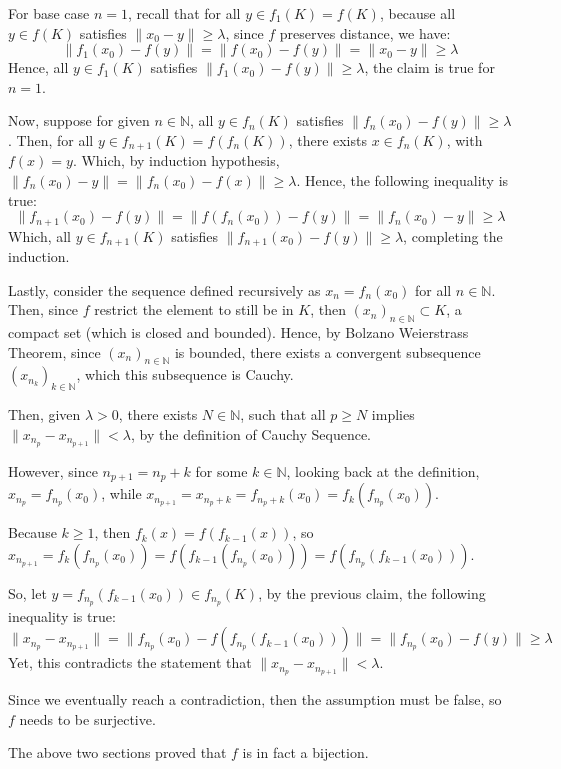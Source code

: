 \documentclass{article}
\begin{document}
For base case $n=1$, recall that for all $y\in f_1(K) = f(K)$, because all $y\in f(K)$ satisfies $\|x_0-y\|\geq \lambda$, since $f$ preserves distance, we have:
$$\|f_1(x_0)-f(y)\| =\|f(x_0)-f(y)\| = \|x_0-y\| \geq \lambda$$
Hence, all $y\in f_1(K)$ satisfies $\|f_1(x_0)-f(y)\|\geq \lambda$, the claim is true for $n=1$.

Now, suppose for given $n\in\mathbb{N}$, all $y\in f_{n}(K)$ satisfies $\|f_n(x_0)-f(y)\|\geq \lambda$.
Then, for all $y\in f_{n+1}(K) = f(f_n(K))$, there exists $x\in f_n(K)$, with $f(x)=y$. Which, by induction hypothesis, $\|f_n(x_0)-y\|=\|f_n(x_0)-f(x)\| \geq \lambda$. 
Hence, the following inequality is true:
$$\|f_{n+1}(x_0)-f(y)\| = \|f(f_n(x_0))-f(y)\| = \|f_n(x_0)-y\| \geq \lambda$$
Which, all $y\in f_{n+1}(K)$ satisfies $\|f_{n+1}(x_0)-f(y)\|\geq \lambda$, completing the induction.

\hfil

Lastly, consider the sequence defined recursively as $x_n=f_n(x_0)$ for all $n\in\mathbb{N}$. Then, since $f$ restrict the element to still be in $K$, then $(x_n)_{n\in\mathbb{N}}\subset K$, a compact set (which is closed and bounded).
Hence, by Bolzano Weierstrass Theorem, since $(x_n)_{n\in\mathbb{N}}$ is bounded, there exists a convergent subsequence $(x_{n_k})_{k\in\mathbb{N}}$, which this subsequence is Cauchy.

Then, given $\lambda>0$, there exists $N\in\mathbb{N}$, such that all $p\geq N$ implies $\|x_{n_p}-x_{n_{p+1}}\| < \lambda$, by the definition of Cauchy Sequence.

However, since $n_{p+1}=n_p+k$ for some $k\in\mathbb{N}$, looking back at the definition, $x_{n_p}=f_{n_p}(x_0)$, while $x_{n_{p+1}}=x_{n_p+k}=f_{n_p+k}(x_0) = f_k(f_{n_p}(x_0))$.

Because $k\geq 1$, then $f_k(x) = f(f_{k-1}(x))$, so $x_{n_{p+1}}=f_k(f_{n_p}(x_0))=f(f_{k-1}(f_{n_p}(x_0))) = f(f_{n_p}(f_{k-1}(x_0)))$.

So, let $y=f_{n_p}(f_{k-1}(x_0))\in f_{n_p}(K)$, by the previous claim, the following inequality is true:
$$\|x_{n_p}-x_{n_{p+1}}\| = \|f_{n_p}(x_0)-f(f_{n_p}(f_{k-1}(x_0)))\| = \|f_{n_p}(x_0)-f(y)\| \geq \lambda$$
Yet, this contradicts the statement that $\|x_{n_p}-x_{n_{p+1}}\| < \lambda$.

\hfil

Since we eventually reach a contradiction, then the assumption must be false, so $f$ needs to be surjective.

\hfil

The above two sections proved that $f$ is in fact a bijection.
\end{document}
